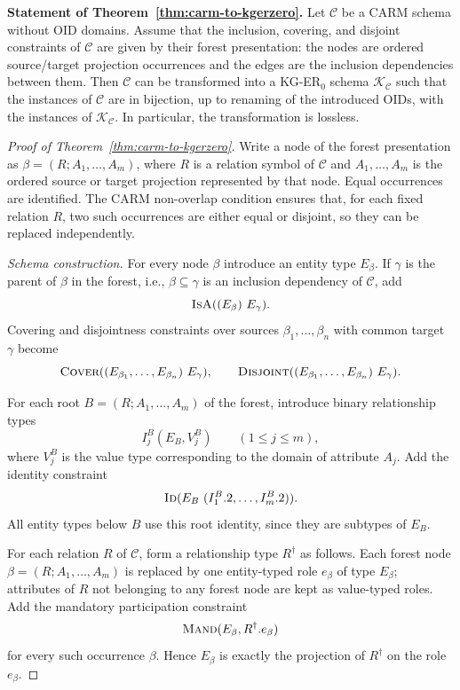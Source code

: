 \documentclass[10pt]{article}
\begin{document}
\noindent\textbf{Statement of Theorem~\ref{thm:carm-to-kgerzero}.}
Let $\mathcal C$ be a \textsf{CARM} schema without OID domains.  Assume
that the inclusion, covering, and disjoint constraints of $\mathcal C$
are given by their forest presentation: the nodes are ordered
source/target projection occurrences and the edges are the inclusion
dependencies between them.  Then $\mathcal C$ can be transformed into a
KG-ER$_0$ schema $\mathcal K_{\mathcal C}$ such that the instances of
$\mathcal C$ are in bijection, up to renaming of the introduced OIDs,
with the instances of $\mathcal K_{\mathcal C}$.  In particular, the
transformation is lossless.

\begin{proof}[Proof of Theorem~\ref{thm:carm-to-kgerzero}]
Write a node of the forest presentation as
$\beta=(R;A_1,\ldots,A_m)$, where $R$ is a relation symbol of
$\mathcal C$ and $A_1,\ldots,A_m$ is the ordered source or target
projection represented by that node.  Equal occurrences are identified.
The \textsf{CARM} non-overlap condition ensures that, for each fixed
relation $R$, two such occurrences are either equal or disjoint, so they
can be replaced independently.

\emph{Schema construction.}
For every node $\beta$ introduce an entity type $E_\beta$.  If
$\gamma$ is the parent of $\beta$ in the forest, i.e.,
$\beta\subseteq\gamma$ is an inclusion dependency of $\mathcal C$, add
\[
  \textsc{IsA}((E_\beta)\ E_\gamma).
\]
Covering and disjointness constraints over sources
$\beta_1,\ldots,\beta_n$ with common target $\gamma$ become
\[
  \textsc{Cover}((E_{\beta_1},\ldots,E_{\beta_n})\ E_\gamma),
  \qquad
  \textsc{Disjoint}((E_{\beta_1},\ldots,E_{\beta_n})\ E_\gamma).
\]

For each root $B=(R;A_1,\ldots,A_m)$ of the forest, introduce binary
relationship types
\[
  I^B_j(E_B,V^B_j) \qquad (1\leq j\leq m),
\]
where $V^B_j$ is the value type corresponding to the domain of
attribute $A_j$.  Add the identity constraint
\[
  \textsc{Id}(E_B\ (I^B_1.2,\ldots,I^B_m.2)).
\]
All entity types below $B$ use this root identity, since they are
subtypes of $E_B$.

For each relation $R$ of $\mathcal C$, form a relationship type
$R^\dagger$ as follows.  Each forest node
$\beta=(R;A_1,\ldots,A_m)$ is replaced by one entity-typed role
$e_\beta$ of type $E_\beta$; attributes of $R$ not belonging to any
forest node are kept as value-typed roles.  Add the mandatory
participation constraint
\[
  \textsc{Mand}(E_\beta,R^\dagger.e_\beta)
\]
for every such occurrence $\beta$.  Hence $E_\beta$ is exactly the
projection of $R^\dagger$ on the role $e_\beta$.


\end{proof}
\end{document}
